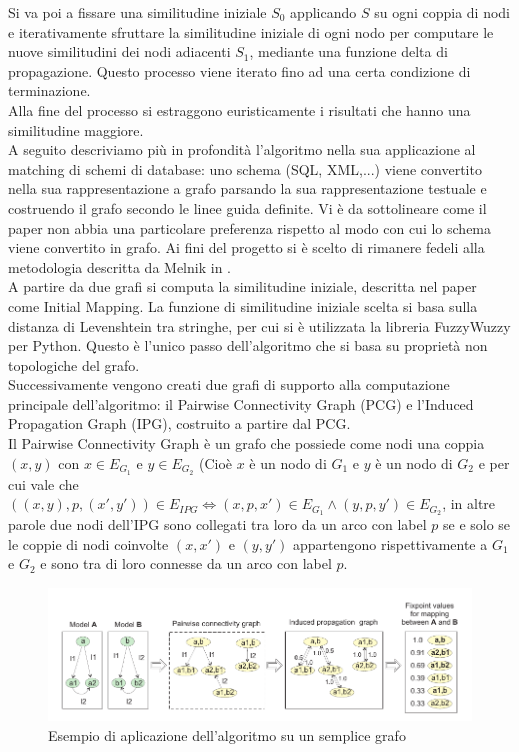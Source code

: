 \documentclass[a4paper,10pt]{article}
\begin{document}
Si va poi a fissare una similitudine iniziale $S_0$ applicando $S$ su ogni coppia di nodi e iterativamente sfruttare la similitudine iniziale di ogni nodo per computare le nuove similitudini dei nodi adiacenti $S_1$, mediante una funzione delta di propagazione. Questo processo viene iterato fino ad una certa condizione di terminazione.\\

Alla fine del processo si estraggono euristicamente i risultati che hanno una similitudine maggiore.\\

A seguito descriviamo più in profondità l’algoritmo nella sua applicazione al matching di schemi di database: uno schema (SQL, XML,...) viene convertito nella sua rappresentazione a grafo parsando la sua rappresentazione testuale e costruendo il grafo secondo le linee guida definite. Vi è da sottolineare come il paper non abbia una particolare preferenza rispetto al modo con cui lo schema viene convertito in grafo. Ai fini del progetto si è scelto di rimanere fedeli alla metodologia descritta da Melnik in \citep{generic_model_man}.\\

A partire da due grafi si computa la similitudine iniziale, descritta nel paper come Initial Mapping. La funzione di similitudine iniziale scelta si basa sulla distanza di Levenshtein tra stringhe, per cui si è utilizzata la libreria FuzzyWuzzy per Python. Questo è l’unico passo dell’algoritmo che si basa su proprietà non topologiche del grafo.\\

Successivamente vengono creati due grafi di supporto alla computazione principale dell’algoritmo: il Pairwise Connectivity Graph (PCG) e l’Induced Propagation Graph (IPG), costruito a partire dal PCG.\\

Il Pairwise Connectivity Graph è un grafo che possiede come nodi una coppia $(x,y)$ con $x\in E_{G_1}$ e $y\in E_{G_2}$ (Cioè $x$ è un nodo di $G_1$ e $y$ è un nodo di $G_2$ e per cui vale che $((x,y), p, (x', y')) \in E_{IPG} \Leftrightarrow (x, p, x') \in E_{G_1} \wedge (y, p, y') \in E_{G_2}$, in altre parole due nodi dell'IPG sono collegati tra loro da un arco con label $p$ se e solo se le coppie di nodi coinvolte $(x, x')$ e $(y, y')$ appartengono rispettivamente a $G_1$ e $G_2$ e sono tra di loro connesse da un arco con label $p$.\\

\begin{figure}
\includegraphics[scale=0.4]{sf.png}
\caption{Esempio di aplicazione dell'algoritmo su un semplice grafo}
\label{sf1}
\end{figure}
\end{document}
